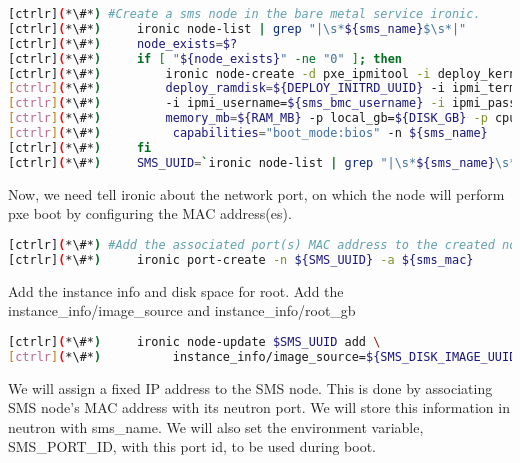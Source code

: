 
\begin{lstlisting}[language=bash,keywords={}]
[ctrlr](*\#*) #Create a sms node in the bare metal service ironic.
[ctrlr](*\#*)     ironic node-list | grep "|\s*${sms_name}$\s*|"
[ctrlr](*\#*)     node_exists=$?
[ctrlr](*\#*)     if [ "${node_exists}" -ne "0" ]; then 
[ctrlr](*\#*)         ironic node-create -d pxe_ipmitool -i deploy_kernel=${DEPLOY_VMLINUZ_UUID} -i \
[ctrlr](*\#*)         deploy_ramdisk=${DEPLOY_INITRD_UUID} -i ipmi_terminal_port=8023 -i ipmi_address=${sms_bmc} \
[ctrlr](*\#*)         -i ipmi_username=${sms_bmc_username} -i ipmi_password=${sms_bmc_password} -p cpus=${CPU} -p \
[ctrlr](*\#*)         memory_mb=${RAM_MB} -p local_gb=${DISK_GB} -p cpu_arch=${ARCH} -p \
[ctrlr](*\#*)          capabilities="boot_mode:bios" -n ${sms_name}
[ctrlr](*\#*)     fi
[ctrlr](*\#*)     SMS_UUID=`ironic node-list | grep "|\s*${sms_name}\s*|" | awk '{print $2}'`
\end{lstlisting} 

	Now, we need tell ironic about the network port, on which the node will perform pxe boot by configuring the MAC address(es). 



\begin{lstlisting}[language=bash,keywords={}]
[ctrlr](*\#*) #Add the associated port(s) MAC address to the created node(s)
[ctrlr](*\#*)     ironic port-create -n ${SMS_UUID} -a ${sms_mac}
\end{lstlisting} 

Add the instance info and disk space for root. \newline
	Add the instance\_info/image\_source and instance\_info/root\_gb
    

\begin{lstlisting}[language=bash,keywords={}]
[ctrlr](*\#*)     ironic node-update $SMS_UUID add \
[ctrlr](*\#*)          instance_info/image_source=${SMS_DISK_IMAGE_UUID} instance_info/root_gb=50
\end{lstlisting} 


	We will assign a fixed IP address to the SMS node. This is done by associating SMS node's MAC address with its neutron port. We will store this information in neutron with sms\_name. We will also set the environment variable, SMS\_PORT\_ID, with this port id, to be used during boot.

